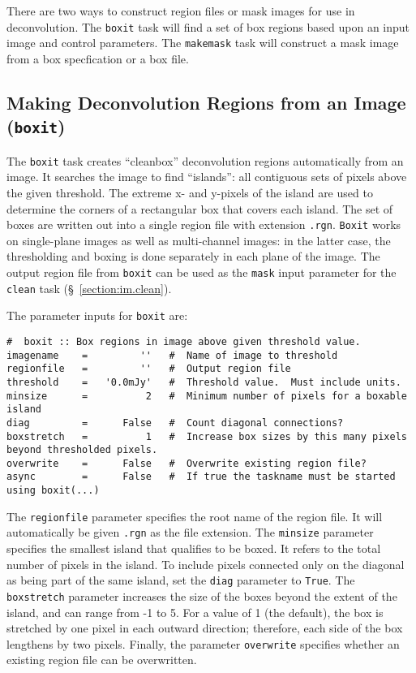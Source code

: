 There are two ways to construct region files or mask images for use
in deconvolution.  The {\tt boxit} task will find a set of box regions
based upon an input image and control parameters.  The {\tt makemask}
task will construct a mask image from a box specfication or a box
file.  

\subsection{Making Deconvolution Regions from an Image ({\tt boxit})}
\label{section:im.mask.boxit}

The {\tt boxit} task creates ``cleanbox'' deconvolution regions automatically
from an image.  It searches the image to find ``islands'': all contiguous
sets of pixels above the given threshold.  The extreme x- and y-pixels of the
island are used to determine the corners of a rectangular box that covers each
island.  The set of boxes are written out into a single region file with
extension {\tt .rgn}.  {\tt Boxit} works on single-plane images as well as
multi-channel images: in the latter case, the thresholding and boxing is done
separately in each plane of the image.  The output region file from {\tt boxit}
can be used as the {\tt mask} input parameter for the {\tt clean} task
(\S~\ref{section:im.clean}).

The parameter inputs for {\tt boxit} are:
\small
\begin{verbatim}
#  boxit :: Box regions in image above given threshold value.
imagename    =         ''   #  Name of image to threshold
regionfile   =         ''   #  Output region file
threshold    =   '0.0mJy'   #  Threshold value.  Must include units.
minsize      =          2   #  Minimum number of pixels for a boxable island
diag         =      False   #  Count diagonal connections?
boxstretch   =          1   #  Increase box sizes by this many pixels beyond thresholded pixels.
overwrite    =      False   #  Overwrite existing region file?
async        =      False   #  If true the taskname must be started using boxit(...)
\end{verbatim}
\normalsize 

The {\tt regionfile} parameter specifies the root name of the region file.  It
will automatically be given {\tt .rgn} as the file extension.  
The {\tt minsize} parameter specifies the smallest island that qualifies to be
boxed.  It refers to the total number of pixels in the island. 
To include pixels connected only on the diagonal as being part of the same
island, set the {\tt diag} parameter to {\tt True}.  The {\tt boxstretch}
parameter increases the size of the boxes beyond the extent of the island, and
can range from -1 to 5.  For a value of 1 (the default), the
box is stretched by one pixel in each outward direction; therefore, each side
of the box lengthens by two pixels.  Finally, the parameter {\tt overwrite}
specifies whether an existing region file can be overwritten.

